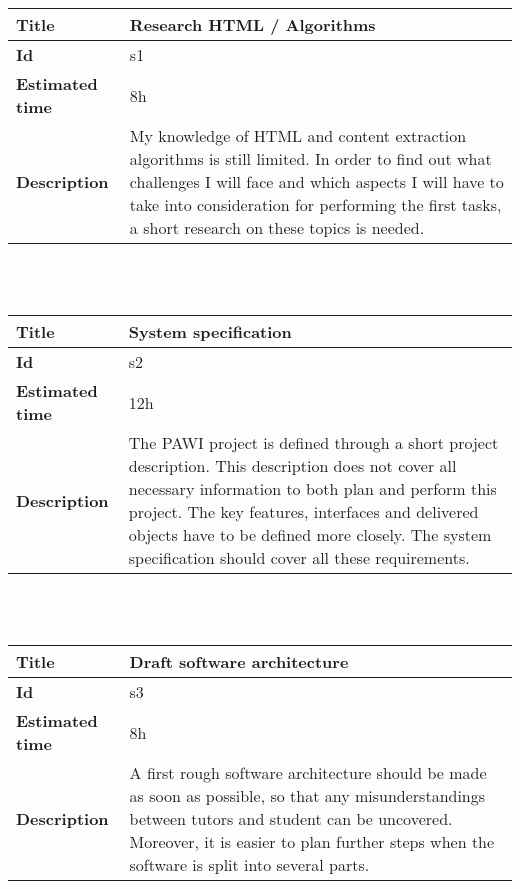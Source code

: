     \begin{tabular}{ | p{4cm} | p{10cm} |}
    \hline
    \textbf{Title} & Research HTML / Algorithms\\ \hline
    \textbf{Id} & s1\\ \hline
    \textbf{Estimated time} & 8h \\ \hline
    \textbf{Description} & My knowledge of HTML and content extraction algorithms is still limited. In order to find out what challenges I will face and which aspects I will have to take into consideration for performing the first tasks, a short research on these topics is needed.\\
    \hline
    \end{tabular} \\\\


    \begin{tabular}{ | p{4cm} | p{10cm} |}
    \hline
    \textbf{Title} & System specification\\ \hline
    \textbf{Id} & s2\\ \hline
    \textbf{Estimated time} & 12h \\ \hline
    \textbf{Description} & The PAWI project is defined through a short project description. This description does not cover all necessary information to both plan and perform this project. The key features, interfaces and delivered objects have to be defined more closely. The system specification should cover all these requirements.\\
    \hline
    \end{tabular} \\\\


    \begin{tabular}{ | p{4cm} | p{10cm} |}
    \hline
    \textbf{Title} & Draft software architecture\\ \hline
    \textbf{Id} & s3\\ \hline
    \textbf{Estimated time} & 8h \\ \hline
    \textbf{Description} & A first rough software architecture should be made as soon as possible, so that any misunderstandings between tutors and student can be uncovered. Moreover, it is easier to plan further steps when the software is split into several parts.\\
    \hline
    \end{tabular} \\\\


